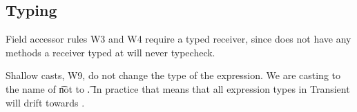 \documentclass[a4paper,USenglish]{tex/lipics-v2016}
\begin{document}
\subsection{Typing}

Field accessor rules W3 and W4 require a typed receiver, since \any does
not have any methods a receiver typed at \any will never typecheck.

Shallow casts, W9, do not change the type of the expression. We are casting
to the name of \t not to \t.  In practice that means that all expression
types in Transient will drift towards \any.

~\\

\begin{mathpar}










\end{mathpar}
\end{document}
